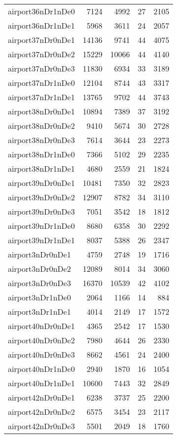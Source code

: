 \begin{tabular}{lrrrr}
airport36nDr1nDe0 & 7124 & 4992 & 27 & 2105 \\
airport36nDr1nDe1 & 5968 & 3611 & 24 & 2057 \\
airport37nDr0nDe1 & 14136 & 9741 & 44 & 4075 \\
airport37nDr0nDe2 & 15229 & 10066 & 44 & 4140 \\
airport37nDr0nDe3 & 11830 & 6934 & 33 & 3189 \\
airport37nDr1nDe0 & 12104 & 8744 & 43 & 3317 \\
airport37nDr1nDe1 & 13765 & 9702 & 44 & 3743 \\
airport38nDr0nDe1 & 10894 & 7389 & 37 & 3192 \\
airport38nDr0nDe2 & 9410 & 5674 & 30 & 2728 \\
airport38nDr0nDe3 & 7614 & 3644 & 23 & 2273 \\
airport38nDr1nDe0 & 7366 & 5102 & 29 & 2235 \\
airport38nDr1nDe1 & 4680 & 2559 & 21 & 1824 \\
airport39nDr0nDe1 & 10481 & 7350 & 32 & 2823 \\
airport39nDr0nDe2 & 12907 & 8782 & 34 & 3110 \\
airport39nDr0nDe3 & 7051 & 3542 & 18 & 1812 \\
airport39nDr1nDe0 & 8680 & 6358 & 30 & 2292 \\
airport39nDr1nDe1 & 8037 & 5388 & 26 & 2347 \\
airport3nDr0nDe1 & 4759 & 2748 & 19 & 1716 \\
airport3nDr0nDe2 & 12089 & 8014 & 34 & 3060 \\
airport3nDr0nDe3 & 16370 & 10539 & 42 & 4102 \\
airport3nDr1nDe0 & 2064 & 1166 & 14 & 884 \\
airport3nDr1nDe1 & 4014 & 2149 & 17 & 1572 \\
airport40nDr0nDe1 & 4365 & 2542 & 17 & 1530 \\
airport40nDr0nDe2 & 7980 & 4644 & 26 & 2330 \\
airport40nDr0nDe3 & 8662 & 4561 & 24 & 2400 \\
airport40nDr1nDe0 & 2940 & 1870 & 16 & 1054 \\
airport40nDr1nDe1 & 10600 & 7443 & 32 & 2849 \\
airport42nDr0nDe1 & 6238 & 3737 & 25 & 2200 \\
airport42nDr0nDe2 & 6575 & 3454 & 23 & 2117 \\
airport42nDr0nDe3 & 5501 & 2049 & 18 & 1760 \\

\end{tabular}
